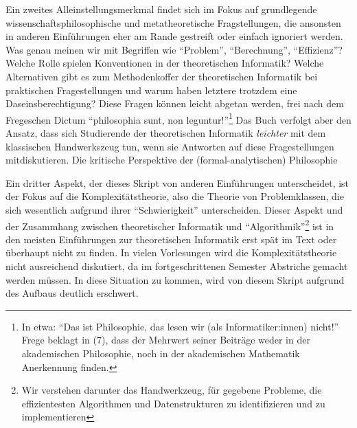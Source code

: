 Ein zweites Alleinstellungsmerkmal findet sich im Fokus auf grundlegende
wissenschaftsphilosophische und metatheoretische Fragstellungen,
die ansonsten in anderen Einführungen eher am Rande gestreift
oder einfach ignoriert werden.
Was genau meinen wir mit Begriffen wie ``Problem'', ``Berechnung'', ``Effizienz''?
Welche Rolle spielen Konventionen in der theoretischen Informatik?
Welche Alternativen gibt es zum Methodenkoffer der theoretischen Informatik
bei praktischen Fragestellungen
und warum haben letztere trotzdem eine Daseinsberechtigung?
Diese Fragen können leicht abgetan werden, frei nach dem Fregeschen Dictum
``philosophia sunt, non leguntur!''\footnote{
    In etwa: ``Das ist Philosophie,
    das lesen wir (als Informatiker:innen) nicht!''
    Frege beklagt in \cite{frege_grundgesetze} (7),
    dass der Mehrwert seiner Beiträge weder in der akademischen Philosophie,
    noch in der akademischen Mathematik Anerkennung finden.
}
Das Buch verfolgt aber den Ansatz,
dass sich Studierende der theoretischen Informatik
\emph {leichter} mit dem klassischen Handwerkszeug tun,
wenn sie Antworten auf diese Fragestellungen mitdiskutieren.
Die kritische Perspektive der (formal-analytischen) Philosophie

Ein dritter Aspekt, der dieses Skript von anderen Einführungen unterscheidet,
ist der Fokus auf die Komplexitätstheorie,
also die Theorie von Problemklassen,
die sich wesentlich aufgrund ihrer ``Schwierigkeit'' unterscheiden.
Dieser Aspekt und der Zusammhang zwischen theoretischer Informatik und ``Algorithmik''\footnote{
    Wir verstehen darunter das Handwerkzeug, für gegebene Probleme,
    die effizientesten Algorithmen und Datenstrukturen zu identifizieren 
    und zu implementieren}
ist in den meisten Einführungen zur theoretischen Informatik
erst spät im Text oder überhaupt nicht zu finden.
In vielen Vorlesungen wird die Komplexitätstheorie nicht ausreichend diskutiert, 
da im fortgeschrittenen Semester Abstriche gemacht werden müssen.
In diese Situation zu kommen, wird von diesem Skript aufgrund des Aufbaus deutlich erschwert.

